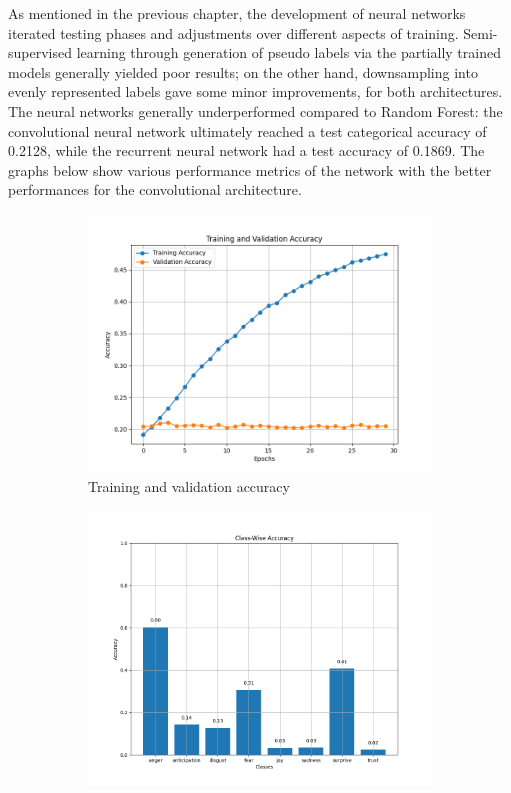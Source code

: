 As mentioned in the previous chapter, the development of neural networks
iterated testing phases and adjustments over different aspects of training.
Semi-supervised learning through generation of pseudo labels via the partially
trained models generally yielded poor results; on the other hand, downsampling
into evenly represented labels gave some minor improvements, for both architectures.
The neural networks generally underperformed compared to Random Forest:
the convolutional neural network ultimately reached a test categorical accuracy
of 0.2128, while the recurrent neural network had a test accuracy of 0.1869. The graphs below show various performance metrics of the network with the better
performances for the convolutional architecture.\\
\begin{figure}[H]
    \centering
    \begin{subfigure}{0.48\textwidth}
        \includegraphics[width=\textwidth]{pictures/cnn_accuracy.png}
        \caption{Training and validation accuracy}
        \label{fig:cnn_train_val_acc}
    \end{subfigure}
    \begin{subfigure}{0.45\textwidth}
        \includegraphics[width=\textwidth]{pictures/cnn_class_accuracy.png}

\end{subfigure}
\end{figure}
